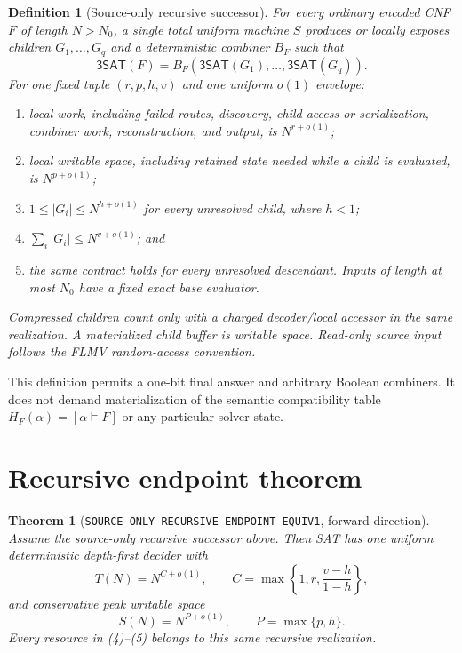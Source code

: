 \documentclass[11pt]{article}
\newtheorem{definition}{Definition}
\newtheorem{theorem}{Theorem}
\newcommand{\SAT}{\mathsf{3SAT}}
\begin{document}
\begin{definition}[Source-only recursive successor]
For every ordinary encoded CNF $F$ of length $N>N_0$, a single total uniform
machine $S$ produces or locally exposes children $G_1,\ldots,G_q$ and a
deterministic combiner $B_F$ such that
\[
 \SAT(F)=B_F(\SAT(G_1),\ldots,\SAT(G_q)).                 \tag{3}
\]
For one fixed tuple $(r,p,h,v)$ and one uniform $o(1)$ envelope:
\begin{enumerate}[leftmargin=*]
\item local work, including failed routes, discovery, child access or
serialization, combiner work, reconstruction, and output, is
$N^{r+o(1)}$;
\item local writable space, including retained state needed while a child is
evaluated, is $N^{p+o(1)}$;
\item $1\le |G_i|\le N^{h+o(1)}$ for every unresolved child, where $h<1$;
\item $\sum_i |G_i|\le N^{v+o(1)}$; and
\item the same contract holds for every unresolved descendant.  Inputs of
length at most $N_0$ have a fixed exact base evaluator.
\end{enumerate}
Compressed children count only with a charged decoder/local accessor in the
same realization.  A materialized child buffer is writable space.  Read-only
source input follows the FLMV random-access convention.
\end{definition}

This definition permits a one-bit final answer and arbitrary Boolean
combiners.  It does not demand materialization of the semantic compatibility
table $H_F(\alpha)=[\alpha\models F]$ or any particular solver state.

\section{Recursive endpoint theorem}

\begin{theorem}[\texttt{SOURCE-ONLY-RECURSIVE-ENDPOINT-EQUIV1}, forward direction]
Assume the source-only recursive successor above.  Then SAT has one uniform
deterministic depth-first decider with
\[
 T(N)=N^{C+o(1)},\qquad
 C=\max\left\{1,r,\frac{v-h}{1-h}\right\},               \tag{4}
\]
and conservative peak writable space
\[
 S(N)=N^{P+o(1)},\qquad P=\max\{p,h\}.                    \tag{5}
\]
Every resource in (4)--(5) belongs to this same recursive realization.
\end{theorem}
\end{document}
